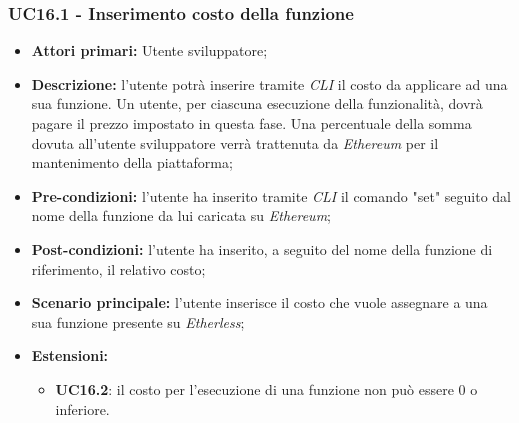 \subsubsection{UC16.1 - Inserimento costo della funzione}
\begin{itemize}
	\item \textbf{Attori primari:} Utente sviluppatore;
	\item \textbf{Descrizione:} l'utente potrà inserire tramite \textit{CLI\glo} il costo da applicare ad una sua funzione. Un utente, per ciascuna esecuzione della funzionalità, dovrà pagare il prezzo impostato in questa fase. Una percentuale della somma dovuta all'utente sviluppatore verrà trattenuta da \textit{Ethereum\glo} per il mantenimento della piattaforma; 
	\item \textbf{Pre-condizioni:} l'utente ha inserito tramite \textit{CLI\glo} il comando "set" seguito dal nome della funzione da lui caricata su \textit{Ethereum\glos};
	\item \textbf{Post-condizioni:} l'utente ha inserito, a seguito del nome della funzione di riferimento, il relativo costo;
	\item \textbf{Scenario principale:} l'utente inserisce il costo che vuole assegnare a una sua funzione presente su \textit{Etherless};
	\item \textbf{Estensioni:} 
	\begin{itemize}
		\item \textbf{UC16.2}: il costo per l'esecuzione di una funzione non può essere 0 o inferiore.
	\end{itemize}
\end{itemize}